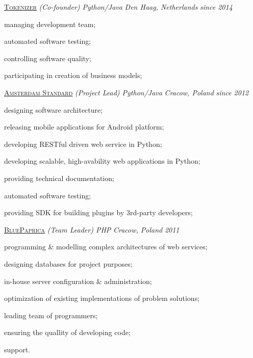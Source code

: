 \documentclass[10pt]{article}
\newenvironment{innerlist}[1][\enskip\textbullet]%
        {\begin{compactitem}[#1]}{\end{compactitem}}
\begin{document}
\href{https://www.tokenizer.com/}{\textsc{Tokenizer}} \textit{(Co-founder) Python/Java} \hspace{0.1in} \textit{Den Haag, Netherlands} \hfill \textit{since 2014}
\vspace{0.05in}
\begin{innerlist}
\item managing development team;
\item automated software testing;
\item controlling software quality;
\item participating in creation of business models; 
\end{innerlist}

\vspace{0.30in}

\href{http://amsterdam-standard.pl/}{\textsc{Amsterdam Standard}} \textit{(Project Lead) Python/Java} \hspace{0.1in} \textit{Cracow, Poland} \hfill \textit{since 2012}
\vspace{0.05in}
\begin{innerlist}
\item designing software architecture;
\item releasing mobile applications for Android platform;
\item developing RESTful driven web service in Python;
\item developing scalable, high-avability web applications in Python;
\item providing technical documentation;
\item automated software testing;
\item providing SDK for building plugins by 3rd-party developers;
\end{innerlist}

\vspace{0.30in}

\href{http://www.bluepaprica.com/}{\textsc{BluePaprica}} \textit{(Team Leader) PHP} \hspace{0.1in} \textit{Cracow, Poland} \hfill \textit{2011}
\vspace{0.05in}
\begin{innerlist}
\item programming \& modelling complex architectures of web services;
\item designing databases for project purposes;
\item in-house server configuration \& administration;
\item optimization of existing implementations of problem solutions;
\item leading team of programmers;
\item ensuring the quallity of developing code;
\item support.
\end{innerlist}
\end{document}
